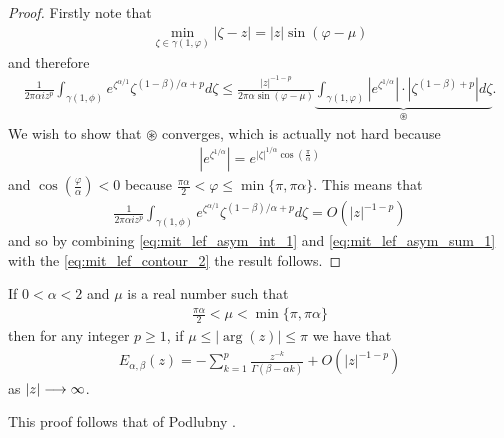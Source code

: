 \begin{proof}
    Firstly note that
    \begin{align}
        \min_{\zeta \in \gamma(1, \varphi)} |\zeta - z| = |z|\sin(\varphi - \mu)
    \end{align}
    and therefore
    \begin{align}
        \label{eq:mit_lef_contour_int_conv}
        \frac{1}{2\pi\alpha i z^p} \int_{\gamma(1,\phi)} e^{\zeta^{\alpha / 1}} \zeta^{(1-\beta)/\alpha + p} d\zeta \leq \frac{|z|^{-1-p}}{2\pi\alpha\sin(\varphi - \mu)} \underbrace{\int_{\gamma(1,\varphi)} \left| e^{\zeta^{1/\alpha}} \right| \cdot \left| \zeta^{(1-\beta)+p}\right| d\zeta}_{\circledast}.
    \end{align}
We wish to show that $ \circledast $ converges, which is actually not hard because 
\begin{align}
    \left| e^{\zeta^{1/\alpha}}\right| = e^{|\zeta|^{1/\alpha} \cos\left(\frac{\pi}{\alpha}\right)}
\end{align}
and $ \cos\left(\frac{\varphi}{\alpha}\right) < 0 $ because $ \frac{\pi \alpha}{2} < \varphi \leq \min\{\pi, \pi \alpha\} $. 
This means that 
\begin{align}
    \label{eq:mit_lef_asym_int_1}
    \frac{1}{2\pi\alpha i z^p} \int_{\gamma(1,\phi)} e^{\zeta^{\alpha / 1}} \zeta^{(1-\beta)/\alpha + p} d\zeta = O(|z|^{-1-p})
\end{align}
and so by combining \eqref{eq:mit_lef_asym_int_1} and \eqref{eq:mit_lef_asym_sum_1} with the \eqref{eq:mit_lef_contour_2} the result follows.
\end{proof}
\begin{lemma}
    \label{lem:mit_lef_asym_exp_2}
    If $ 0 < \alpha < 2 $ and $ \mu $ is a real number such that
    \begin{align}
        \frac{\pi \alpha}{2} < \mu < \min\{\pi, \pi \alpha \}
    \end{align}
    then for any integer $ p \geq 1 $, if $ \mu \leq |\arg(z)| \leq \pi $ we have that
    \begin{align}
        E_{\alpha, \beta}(z) = - \sum_{k=1}^p \frac{z^{-k}}{\Gamma(\beta - \alpha k)} + O(|z|^{-1-p})
    \end{align}
    as $ |z| \longrightarrow \infty $.
\end{lemma}
This proof follows that of Podlubny \cite{Podlubny1999}. 
